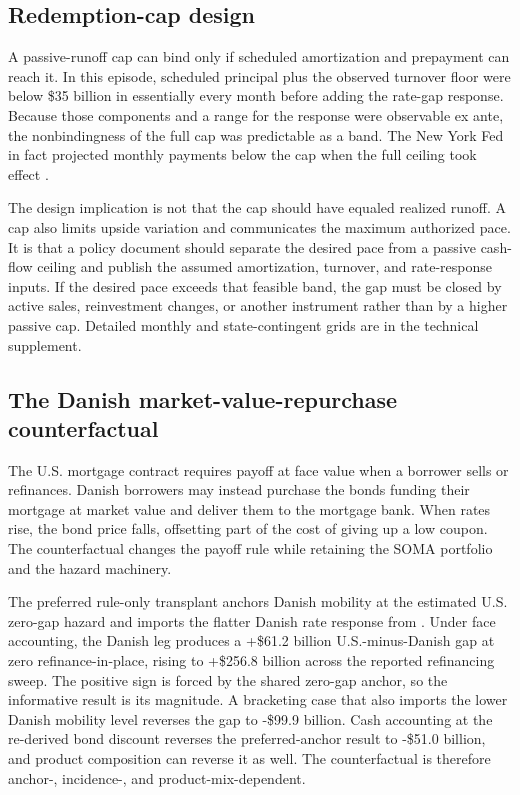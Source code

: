 \documentclass[12pt]{article}
\begin{document}
\subsection{Redemption-cap design}\label{sec:discussion-capdesign}

A passive-runoff cap can bind only if scheduled amortization and prepayment can
reach it. In this episode, scheduled principal plus the observed turnover floor
were below \$35 billion in essentially every month before adding the rate-gap
response. Because those components and a range for the response were observable
ex ante, the nonbindingness of the full cap was predictable as a band. The New
York Fed in fact projected monthly payments below the cap when the full ceiling
took effect \citep{nyfed2022}.

The design implication is not that the cap should have equaled realized runoff.
A cap also limits upside variation and communicates the maximum authorized pace.
It is that a policy document should separate the desired pace from a passive
cash-flow ceiling and publish the assumed amortization, turnover, and
rate-response inputs. If the desired pace exceeds that feasible band, the gap
must be closed by active sales, reinvestment changes, or another instrument
rather than by a higher passive cap. Detailed monthly and state-contingent grids
are in the technical supplement.

\subsection{The Danish market-value-repurchase counterfactual}\label{sec:discussion-policy}\label{sec:abm-danish}

The U.S. mortgage contract requires payoff at face value when a borrower sells
or refinances. Danish borrowers may instead purchase the bonds funding their
mortgage at market value and deliver them to the mortgage bank. When rates rise,
the bond price falls, offsetting part of the cost of giving up a low coupon.
The counterfactual changes the payoff rule while retaining the SOMA portfolio
and the hazard machinery.

The preferred rule-only transplant anchors Danish mobility at the estimated
U.S. zero-gap hazard and imports the flatter Danish rate response from
\citet{berger2026}. Under face accounting, the Danish leg produces a
+\$61.2 billion U.S.-minus-Danish gap at zero refinance-in-place, rising to
+\$256.8 billion across the reported refinancing sweep. The positive sign is
forced by the shared zero-gap anchor, so the informative result is its
magnitude. A bracketing case that also imports the lower Danish mobility level
reverses the gap to -\$99.9 billion. Cash accounting at the re-derived bond
discount reverses the preferred-anchor result to -\$51.0 billion, and product
composition can reverse it as well. The counterfactual is therefore anchor-,
incidence-, and product-mix-dependent.
\end{document}

